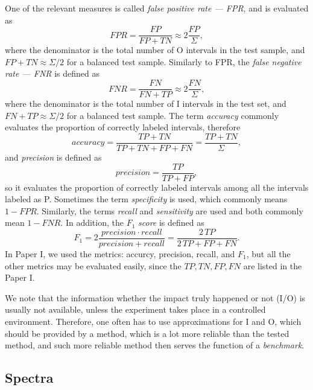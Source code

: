 One of the relevant measures is called \textit{false positive rate --- FPR}, and is evaluated as 
\begin{equation}
    FPR = \frac{FP}{FP+TN} \approx 2 \frac{FP}{\Sigma},
\end{equation}
where the denominator is the total number of O intervals in the test sample, and $FP+TN \approx \Sigma/2$ for a balanced test sample. Similarly to FPR, the \textit{false negative rate --- FNR} is defined as
\begin{equation}
    FNR = \frac{FN}{FN+TP} \approx 2 \frac{FN}{\Sigma},
\end{equation}
where the denominator is the total number of I intervals in the test set, and $FN+TP \approx \Sigma/2$ for a balanced test sample. The term \textit{accuracy} commonly evaluates the proportion of correctly labeled intervals, therefore
\begin{equation}
    accuracy = \frac{TP + TN}{TP + TN + FP + FN} = \frac{TP + TN}{\Sigma},
\end{equation}
and \textit{precision} is defined as
\begin{equation}
    precision = \frac{TP}{TP + FP},
\end{equation}
so it evaluates the proportion of correctly labeled intervals among all the intervals labeled as P. Sometimes the term \textit{specificity} is used, which commonly means $1-FPR$. Similarly, the terms \textit{recall} and \textit{sensitivity} are used and both commonly mean $1-FNR$. In addition, the $F_1$ \textit{score} is defined as
\begin{equation}
    F_1 = 2\frac{precision \cdot recall}{precision + recall} = \frac{2 \, TP}{2 \, TP + FP + FN}.
\end{equation}
In Paper I, we used the metrics: accurcy, precision, recall, and $F_1$, but all the other metrics may be evaluated easily, since the $TP, TN, FP, FN$ are listed in the Paper I. 

We note that the information whether the impact truly happened or not (I/O) is usually not available, unless the experiment takes place in a controlled environment. Therefore, one often has to use approximations for I and O, which should be provided by a method, which is a lot more reliable than the tested method, and such more reliable method then serves the function of a \textit{benchmark}.

\subsection{Spectra}

